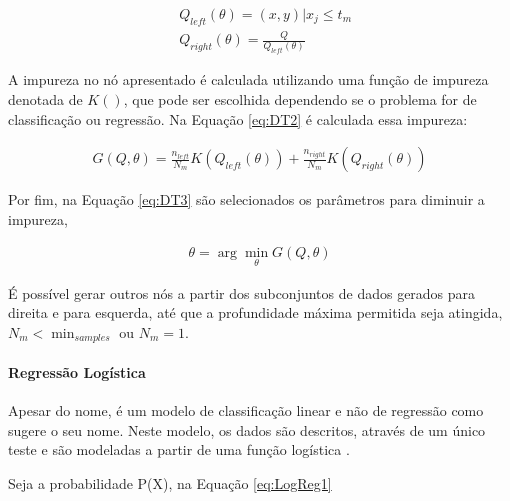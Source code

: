           \begin{equation}\label{eq:DT}
            \begin{aligned}
              & Q_{left}(\theta) = (x,y)|x_{j} \leq t_{m} \\
              & Q_{right}(\theta) = \frac{Q}{Q_{left}(\theta)}
          \end{aligned}
          \end{equation}


          A impureza no nó apresentado é calculada utilizando uma função de impureza denotada de $K()$, que pode ser escolhida dependendo se o 
          problema for de classificação ou regressão. Na Equação \ref{eq:DT2} é calculada essa impureza:

          \begin{equation}\label{eq:DT2}
            \begin{aligned}
              G(Q,\theta) = \frac{n_{left}}{N_{m}}K(Q_{left}(\theta)) + \frac{n_{right}}{N_{m}}K(Q_{right}(\theta))
          \end{aligned}
          \end{equation}


          Por fim, na Equação \ref{eq:DT3} são selecionados os parâmetros para diminuir a impureza,

          \begin{equation}\label{eq:DT3}
            \begin{aligned}
              \theta = \arg\min_{\theta}G(Q,\theta)
          \end{aligned} 
          \end{equation}

          É possível gerar outros nós a partir dos subconjuntos de dados gerados para direita e para esquerda, 
          até que a profundidade máxima permitida seja atingida, $N_{m} < \min_{samples}$ ou $N_{m} = 1$.

        \paragraph{Regressão Logística}

          Apesar do nome, é um modelo de classificação linear e não de regressão como sugere o seu nome. Neste modelo, os dados
          são descritos, através de um único teste e são modeladas a partir de uma função logística \cite{nasrabadi2007pattern}.

          Seja a probabilidade P(X), na Equação \ref{eq:LogReg1}


